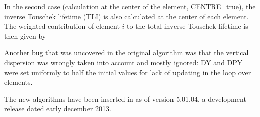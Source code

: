 In the second case (calculation at the center of the element,
CENTRE=true), the inverse Touschek lifetime (TLI) is also calculated at
the center of each element. The weighted contribution of element $i$ to
the total inverse Touschek lifetime is then given by 

Another bug that was uncovered in the original algorithm was that the
vertical dispersion was wrongly taken into account and mostly ignored:
DY and DPY were set uniformly to half the initial values for lack of
updating in the loop over elements.  

The new algorithms have been inserted in \madx as of version 5.01.04, a
development release dated early december 2013.  

